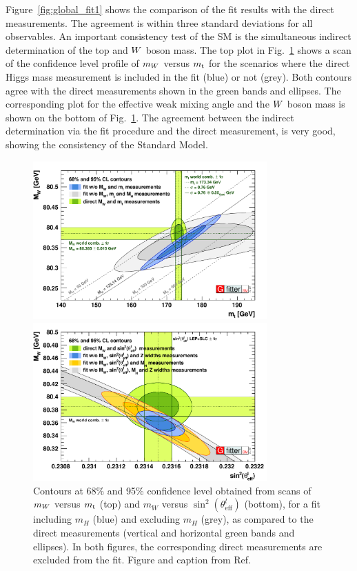 Figure~\ref{fig:global_fit1} shows the comparison of the fit results with the direct measurements.
The agreement is within three standard deviations for all observables. 
An important consistency test of the SM is the simultaneous indirect determination of
the top and $W$ boson mass. The top plot in Fig.~\ref{fig:global_fit} shows a scan of the
confidence level profile of $m_{W}$ versus $m_{\mathrm{t}}$ for the scenarios where the direct Higgs mass
measurement is included in the fit (blue) or not (grey). Both contours agree with the direct
measurements shown in the green bands and ellipses. The corresponding plot for the effective weak
mixing angle and the $W$ boson mass is shown on the bottom of Fig.~\ref{fig:global_fit}. 
The agreement between the indirect determination via the fit procedure and the direct measurement,
is very good, showing the consistency of the Standard Model. 


\begin{figure}[p]
  \centering
  \includegraphics[width=0.8\textwidth]{figures/standardmodel/2014_07_16_Scan2D_MWvsmt_logo}
  
  \vspace{1eM}
  
  \includegraphics[width=0.8\textwidth]{figures/standardmodel/2014_07_16_Scan2D_MWvsSinEffLep_logo}
\caption{Contours at 68\% and 95\% confidence level obtained from scans of $m_{W}$ versus $m_{\mathrm{t}}$
(top) and $m_W$ versus $\sin^2 (\theta^l_{\text{eff}})$ (bottom), for a fit including $m_H$ (blue)
and excluding $m_H$ (grey), as compared to the direct measurements (vertical and horizontal green
bands and ellipses). In both figures, the corresponding direct measurements are excluded
from the fit. Figure and caption from Ref.~\cite{Baak:2014ora}
\label{fig:global_fit}}
\end{figure}


